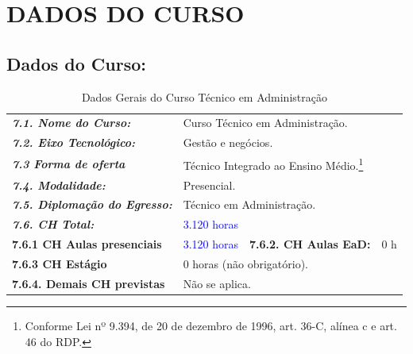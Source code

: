 \documentclass{../../modelos/latex-shared/ifsc-ppc}
\newcommand{\revisao}[1]{\textcolor{blue}{#1}}
\newcommand{\revisao}[1]{#1}
\begin{document}
\section{DADOS DO CURSO}
\subsection{Dados do Curso:}

\renewcommand{\tablename}{Quadro}
\begin{table}[H]
\centering
\small
\caption{Dados Gerais do Curso Técnico em Administração}
\label{qua:dados-curso}
\vspace{0.2cm}
\begin{tabularx}{\linewidth}{|p{4.4cm}|X|p{3.8cm}|X|}
\hline
\rowcolor{cinzaTabela}
\multicolumn{4}{|l|}{\textcolor{ifscgreen}{\textbf{\large 7. Dados do Curso:}}} \\ \hline
\textcolor{ifscgreen}{\textbf{\textit{7.1. Nome do Curso:}}} & \multicolumn{3}{p{\dimexpr\linewidth-4.4cm-4\tabcolsep-3\arrayrulewidth\relax}|}{Curso Técnico em Administração.} \\ \hline
\textcolor{ifscgreen}{\textbf{\textit{7.2. Eixo Tecnológico:}}} & \multicolumn{3}{p{\dimexpr\linewidth-4.4cm-4\tabcolsep-3\arrayrulewidth\relax}|}{Gestão e negócios.} \\ \hline
\textcolor{ifscgreen}{\textbf{\textit{7.3 Forma de oferta}}} & \multicolumn{3}{p{\dimexpr\linewidth-4.4cm-4\tabcolsep-3\arrayrulewidth\relax}|}{Técnico Integrado ao Ensino Médio.\footnote{Conforme Lei nº 9.394, de 20 de dezembro de 1996, art. 36-C, alínea c e art. 46 do RDP.}} \\ \hline
\textcolor{ifscgreen}{\textbf{\textit{7.4. Modalidade:}}} & \multicolumn{3}{p{\dimexpr\linewidth-4.4cm-4\tabcolsep-3\arrayrulewidth\relax}|}{Presencial.} \\ \hline
\textcolor{ifscgreen}{\textbf{\textit{7.5. Diplomação do Egresso:}}} & \multicolumn{3}{p{\dimexpr\linewidth-4.4cm-4\tabcolsep-3\arrayrulewidth\relax}|}{Técnico em Administração.} \\ \hline
\textcolor{ifscgreen}{\textbf{\textit{7.6. CH Total:}}} & \multicolumn{3}{p{\dimexpr\linewidth-4.4cm-4\tabcolsep-3\arrayrulewidth\relax}|}{\revisao{3.120 horas}} \\ \hline
\textcolor{ifscgreen}{\textbf{7.6.1 CH Aulas presenciais}} & \revisao{3.120 horas} & \textcolor{ifscgreen}{\textbf{7.6.2. CH Aulas EaD:}} & 0 h \\ \hline
\textcolor{ifscgreen}{\textbf{7.6.3 CH Estágio}} & \multicolumn{3}{p{\dimexpr\linewidth-4.4cm-4\tabcolsep-3\arrayrulewidth\relax}|}{0 horas (não obrigatório).} \\ \hline
\textcolor{ifscgreen}{\textbf{7.6.4. Demais CH previstas}} & \multicolumn{3}{p{\dimexpr\linewidth-4.4cm-4\tabcolsep-3\arrayrulewidth\relax}|}{Não se aplica.} \\ \hline
\end{tabularx}
\end{table}
\end{document}
